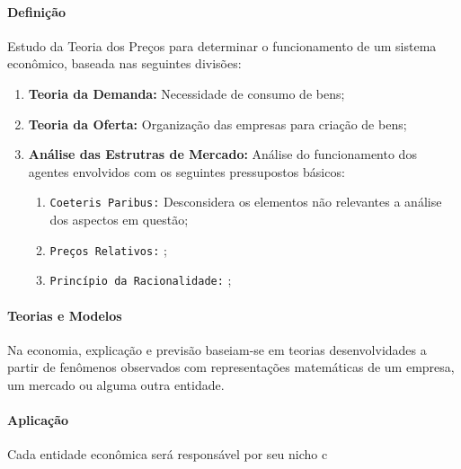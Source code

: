 \documentclass{article}
\begin{document}
            \paragraph{Definição}Estudo da Teoria dos Preços para determinar o funcionamento de um sistema econômico, baseada nas seguintes divisões:
                \begin{enumerate}[noitemsep, rightmargin = \leftmargin]
                    \item \textbf{Teoria da Demanda:} Necessidade de consumo de bens;

                    \item \textbf{Teoria da Oferta:} Organização das empresas para criação de bens;

                    \item \textbf{Análise das Estrutras de Mercado:} Análise do funcionamento dos agentes envolvidos com os seguintes pressupostos básicos:
                        \begin{enumerate}[noitemsep, rightmargin = \leftmargin]
                            \item \texttt{Coeteris Paribus:} Desconsidera os elementos não relevantes a análise dos aspectos em questão; 
                            \item \texttt{Preços Relativos:} ;
                            \item \texttt{Princípio da Racionalidade:} ;
                        \end{enumerate}
                \end{enumerate}

            \paragraph{Teorias e Modelos}Na economia, explicação e previsão baseiam-se em teorias desenvolvidades a partir de fenômenos observados com representações matemáticas de um empresa, um mercado ou alguma outra entidade.

            \paragraph{Aplicação}Cada entidade econômica será responsável por seu nicho c
\end{document}
